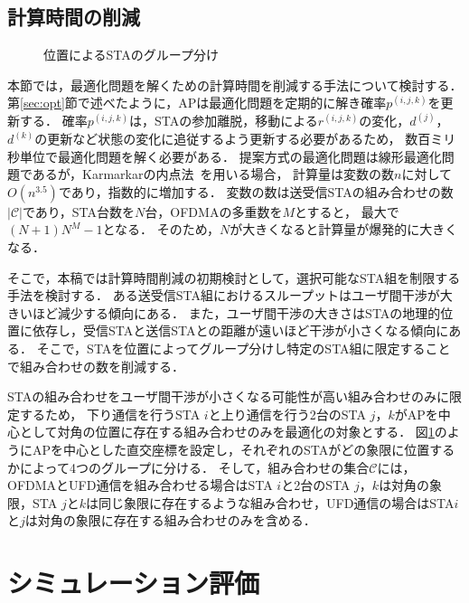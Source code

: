 \documentclass[technicalreport]{ieicej}
\newcommand{\pijk}{p^{(i,j,k)}}
\newcommand{\rijk}{r^{(i,j,k)}}
\newcommand{\mthc}{\mathcal C}
\begin{document}
	\subsection{計算時間の削減}\label{sec:time}
		\begin{figure}[t]
			\centering
			\caption{位置によるSTAのグループ分け}
			\label{fig:time_image}
		\end{figure}
		本節では，最適化問題を解くための計算時間を削減する手法について検討する．
		第\ref{sec:opt}節で述べたように，APは最適化問題を定期的に解き確率$\pijk$を更新する．
		確率$\pijk$は，STAの参加離脱，移動による$\rijk$の変化，$d^{(j)}$，$d^{(k)}$の更新など状態の変化に追従するよう更新する必要があるため，
		数百ミリ秒単位で最適化問題を解く必要がある．
		提案方式の最適化問題は線形最適化問題であるが，Karmarkarの内点法~\cite{karmarkar}を用いる場合，
		計算量は変数の数$n$に対して$O(n^{3.5})$であり，指数的に増加する．
		変数の数は送受信STAの組み合わせの数$|{\mthc}|$であり，STA台数を$N$台，OFDMAの多重数を$M$とすると，
		最大で$(N+1)N^M-1$となる．
		そのため，$N$が大きくなると計算量が爆発的に大きくなる．
		\par
		そこで，本稿では計算時間削減の初期検討として，選択可能なSTA組を制限する手法を検討する．
		ある送受信STA組におけるスループットはユーザ間干渉が大きいほど減少する傾向にある．
		また，ユーザ間干渉の大きさはSTAの地理的位置に依存し，受信STAと送信STAとの距離が遠いほど干渉が小さくなる傾向にある．
		そこで，STAを位置によってグループ分けし特定のSTA組に限定することで組み合わせの数を削減する．
		\par
		STAの組み合わせをユーザ間干渉が小さくなる可能性が高い組み合わせのみに限定するため，
		下り通信を行うSTA $i$と上り通信を行う2台のSTA $j$，$k$がAPを中心として対角の位置に存在する組み合わせのみを最適化の対象とする．
		図\ref{fig:time_image}のようにAPを中心とした直交座標を設定し，それぞれのSTAがどの象限に位置するかによって4つのグループに分ける．
		そして，組み合わせの集合$\mthc$には，OFDMAとUFD通信を組み合わせる場合はSTA $i$と2台のSTA $j$，$k$は対角の象限，STA $j$と$k$は同じ象限に存在するような組み合わせ，UFD通信の場合はSTA$i$と$j$は対角の象限に存在する組み合わせのみを含める．

\section{シミュレーション評価}
\end{document}
